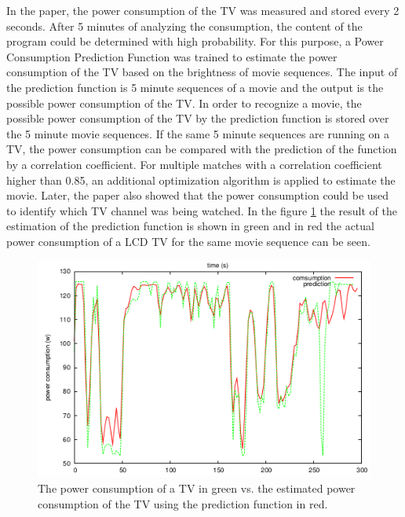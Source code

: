 In the paper, the power consumption of the TV was measured and stored every 2 seconds. After 5 minutes of analyzing the consumption, the content of the program could be determined with high probability. For this purpose, a Power Consumption Prediction Function was trained to estimate the power consumption of the TV based on the brightness of movie sequences. 
The input of the prediction function is 5 minute sequences of a movie and the output is the possible power consumption of the TV. 
In order to recognize a movie, the possible power consumption of the TV by the prediction function is stored over the 5 minute movie sequences. If the same 5 minute sequences are running on a TV, the power consumption can be compared with the prediction of the function by a correlation coefficient. For multiple matches with a correlation coefficient higher than 0.85, an additional optimization algorithm is applied to estimate the movie. Later, the paper also showed that the power consumption could be used to identify which TV channel was being watched. In the figure \ref{fig:tv} the result of the estimation of the prediction function is shown in green and in red the actual power consumption of a LCD TV for the same movie sequence can be seen. 
\begin{figure}[tbp]
  \centering
  \includegraphics[width=1\textwidth]{images/Fernseher.png}
  \caption[Estimated power consumption of a TV]{The power consumption of a TV in green vs. the estimated power consumption of the TV using the prediction function in red.}
  \label{fig:tv}
\end{figure}
